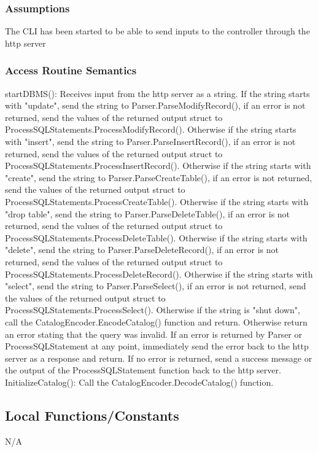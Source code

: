 \documentclass[12pt]{article}
\begin{document}
\subsubsection {Assumptions}
The CLI has been started to be able to send inputs to the controller through the http server

\subsubsection{Access Routine Semantics}
\noindent startDBMS(): Receives input from the http server as a string. If the string starts with "update", send the string to Parser.ParseModifyRecord(), if an error is not returned, send the values of the returned output struct to ProcessSQLStatements.ProcessModifyRecord(). Otherwise if the string starts with "insert", send the string to Parser.ParseInsertRecord(), if an error is not returned, send the values of the returned output struct to ProcessSQLStatements.ProcessInsertRecord(). Otherwise if the string starts with "create", send the string to Parser.ParseCreateTable(), if an error is not returned, send the values of the returned output struct to ProcessSQLStatements.ProcessCreateTable(). Otherwise if the string starts with "drop table", send the string to Parser.ParseDeleteTable(), if an error is not returned, send the values of the returned output struct to ProcessSQLStatements.ProcessDeleteTable(). Otherwise if the string starts with "delete", send the string to Parser.ParseDeleteRecord(), if an error is not returned, send the values of the returned output struct to ProcessSQLStatements.ProcessDeleteRecord(). Otherwise if the string starts with "select", send the string to Parser.ParseSelect(), if an error is not returned, send the values of the returned output struct to ProcessSQLStatements.ProcessSelect(). Otherwise if the string is "shut down", call the CatalogEncoder.EncodeCatalog() function and return. Otherwise return an error stating that the query was invalid. If an error is returned by Parser or ProcessSQLStatement at any point, immediately send the error back to the http server as a response and return. If no error is returned, send a success message or the output of the ProcessSQLStatement function back to the http server.\\

\noindent InitializeCatalog(): Call the CatalogEncoder.DecodeCatalog() function.

\subsection{Local Functions/Constants}
N/A
\end{document}
